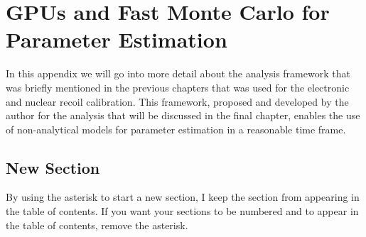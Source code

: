 

\pagestyle{cu}
\graphicspath{{./Chapter4/images/}}

\chapter[GPUs and Fast Monte Carlo for Parameter Estimation][GPUs and Fast Monte Carlo for Parameter Estimation]{GPUs and Fast Monte Carlo for Parameter Estimation}
\label{app:gpus}

In this appendix we will go into more detail about the analysis framework that was briefly mentioned in the previous chapters that was used for the electronic and nuclear recoil calibration.  This framework, proposed and developed by the author for the analysis that will be discussed in the final chapter, enables the use of non-analytical models for parameter estimation in a reasonable time frame.  

\section{New Section}

By using the asterisk to start a new section, I keep the section from appearing in the table of contents.
If you want your sections to be numbered and to appear in the table of contents, remove the asterisk.

